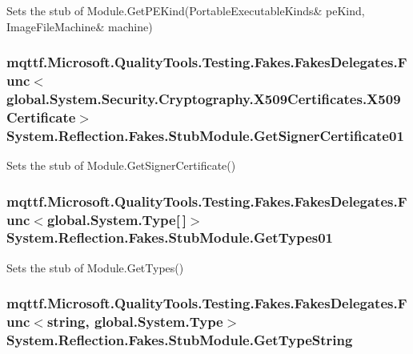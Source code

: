 Sets the stub of Module.\-Get\-P\-E\-Kind(Portable\-Executable\-Kinds\& pe\-Kind, Image\-File\-Machine\& machine)

\hypertarget{class_system_1_1_reflection_1_1_fakes_1_1_stub_module_a28fc6a2cd83888e2f6961231ee742fcc}{
\subsubsection[{Get\-Signer\-Certificate01}]{\setlength{\rightskip}{0pt plus 5cm}mqttf.\-Microsoft.\-Quality\-Tools.\-Testing.\-Fakes.\-Fakes\-Delegates.\-Func$<$global.\-System.\-Security.\-Cryptography.\-X509\-Certificates.\-X509\-Certificate$>$ System.\-Reflection.\-Fakes.\-Stub\-Module.\-Get\-Signer\-Certificate01}}\label{class_system_1_1_reflection_1_1_fakes_1_1_stub_module_a28fc6a2cd83888e2f6961231ee742fcc}


Sets the stub of Module.\-Get\-Signer\-Certificate()

\hypertarget{class_system_1_1_reflection_1_1_fakes_1_1_stub_module_aa6220dd819c4591787d52e29d2519939}{
\subsubsection[{Get\-Types01}]{\setlength{\rightskip}{0pt plus 5cm}mqttf.\-Microsoft.\-Quality\-Tools.\-Testing.\-Fakes.\-Fakes\-Delegates.\-Func$<$global.\-System.\-Type\mbox{[}$\,$\mbox{]}$>$ System.\-Reflection.\-Fakes.\-Stub\-Module.\-Get\-Types01}}\label{class_system_1_1_reflection_1_1_fakes_1_1_stub_module_aa6220dd819c4591787d52e29d2519939}


Sets the stub of Module.\-Get\-Types()

\hypertarget{class_system_1_1_reflection_1_1_fakes_1_1_stub_module_afa0404650f305a17b8b56e38626b7dbc}{
\subsubsection[{Get\-Type\-String}]{\setlength{\rightskip}{0pt plus 5cm}mqttf.\-Microsoft.\-Quality\-Tools.\-Testing.\-Fakes.\-Fakes\-Delegates.\-Func$<$string, global.\-System.\-Type$>$ System.\-Reflection.\-Fakes.\-Stub\-Module.\-Get\-Type\-String}}\label{class_system_1_1_reflection_1_1_fakes_1_1_stub_module_afa0404650f305a17b8b56e38626b7dbc}



